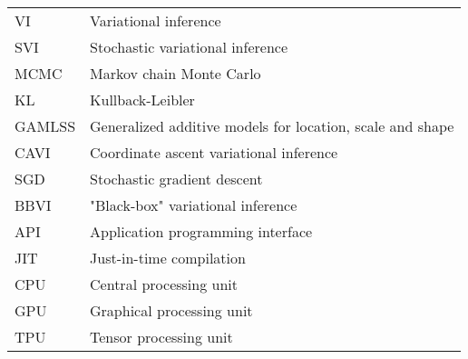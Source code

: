 \begin{tabular}{@{} l @{\hskip 1in} l}
  VI & Variational inference \\
  SVI & Stochastic variational inference \\
  MCMC & Markov chain Monte Carlo \\
  KL & Kullback-Leibler \\
  GAMLSS & Generalized additive models for location, scale and shape \\
  CAVI & Coordinate ascent variational inference \\
  SGD & Stochastic gradient descent \\
  BBVI & "Black-box" variational inference \\
  API & Application programming interface \\
  JIT & Just-in-time compilation \\
  CPU & Central processing unit \\
  GPU & Graphical processing unit \\
  TPU & Tensor processing unit \\
\end{tabular}
